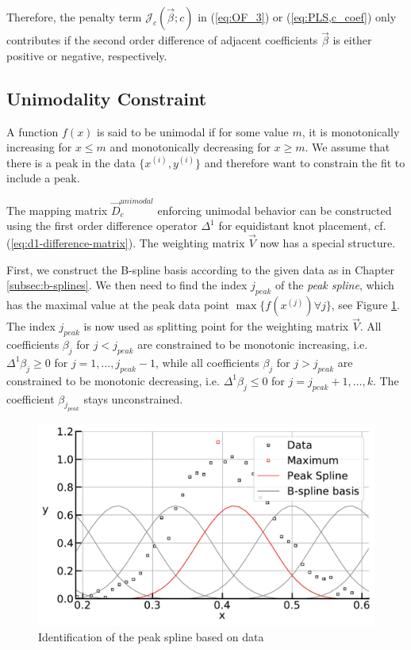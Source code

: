 \documentclass[10pt,a4paper]{report}
\begin{document}
Therefore, the penalty term $\mathcal{J}_c(\vec{\beta}; c)$ in (\ref{eq:OF_3}) or (\ref{eq:PLS,c_coef}) only contributes if the second order difference of adjacent coefficients $\vec{\beta}$ is either positive or negative, respectively. \cite{eilers2005unimodal}

\subsection{Unimodality Constraint}

A function $f(x)$ is said to be unimodal if for some value $m$, it is monotonically increasing for $x \le m$ and monotonically decreasing for $x \ge m$. We assume that there is a peak in the data $\{x^{(i)}, y^{(i)}\}$ and therefore want to constrain the fit to include a peak.

The mapping matrix $\vec{D}_c^{unimodal}$ enforcing unimodal behavior can be constructed using the first order difference operator $\Delta^1$ for equidistant knot placement, cf. (\ref{eq:d1-difference-matrix}). The weighting matrix $\vec{V}$ now has a special structure. 

First, we construct the B-spline basis according to the given data as in Chapter \ref{subsec:b-splines}. We then need to find the index $j_{peak}$ of the \emph{peak spline}, which has the maximal value at the peak data point $\max \{f(x^{(j)}) \forall j\}$, see Figure \ref{fig:peak_spline}. The index $j_{peak}$ is now used as splitting point for the weighting matrix $\vec{V}$. All coefficients $\beta_j$ for $j < j_{peak}$ are constrained to be monotonic increasing, i.e. $\Delta^1 \beta_j \ge 0$ for $j = 1, \dots, j_{peak}-1$, while all coefficients $\beta_j$ for $j > j_{peak}$ are constrained to be monotonic decreasing, i.e. $\Delta^1 \beta_j \le 0$ for $j = j_{peak}+1, \dots, k$. The coefficient $\beta_{j_{peak}}$ stays unconstrained. \cite{eilers2005unimodal} 

\begin{figure}[H]
	\centering
	\includegraphics[width=\linewidth]{../thesisplots/peak_spline.pdf}
	\caption{Identification of the peak spline based on data}
	\label{fig:peak_spline}
\end{figure}
\end{document}
